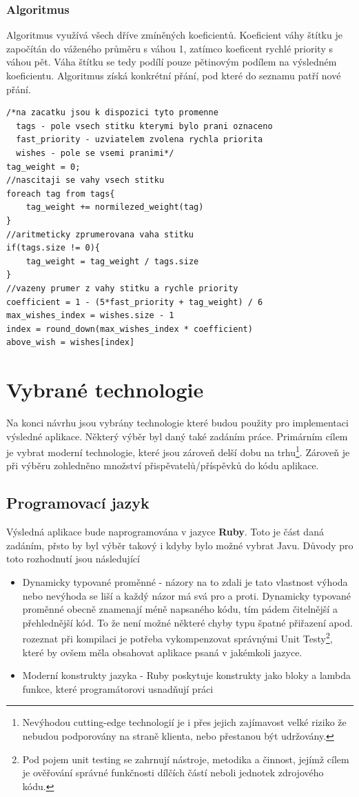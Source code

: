 \subsubsection{Algoritmus}
Algoritmus využívá všech dříve zmíněných koeficientů. Koeficient váhy štítku je započítán do váženého průměru s váhou 1, zatímco koeficent rychlé priority s váhou pět. Váha štítku se tedy podílí pouze pětinovým podílem na výsledném koeficientu. Algoritmus získá konkrétní přání, pod které do seznamu patří nové přání.
\lstset{language = c, style=custom}
\begin{lstlisting}
/*na zacatku jsou k dispozici tyto promenne
  tags - pole vsech stitku kterymi bylo prani oznaceno
  fast_priority - uzviatelem zvolena rychla priorita
  wishes - pole se vsemi pranimi*/
tag_weight = 0;
//nascitaji se vahy vsech stitku
foreach tag from tags{
	tag_weight += normilezed_weight(tag)
}
//aritmeticky zprumerovana vaha stitku
if(tags.size != 0){
	tag_weight = tag_weight / tags.size
}
//vazeny prumer z vahy stitku a rychle priority
coefficient = 1 - (5*fast_priority + tag_weight) / 6
max_wishes_index = wishes.size - 1
index = round_down(max_wishes_index * coefficient)
above_wish = wishes[index]
\end{lstlisting}

\section{Vybrané technologie}
Na konci návrhu jsou vybrány technologie které budou použity pro implementaci výsledné aplikace. Některý výběr byl daný také zadáním práce. Primárním cílem je vybrat moderní technologie, které jsou zároveň delší dobu na trhu\footnote{Nevýhodou cutting-edge technologií je i přes jejich zajímavost velké riziko že nebudou podporovány na straně klienta, nebo přestanou být udržovány.}. Zároveň je při výběru zohledněno množství přispěvatelů/příspěvků do kódu aplikace.
\subsection{Programovací jazyk}
Výsledná aplikace bude naprogramována v jazyce \textbf{Ruby}. Toto je část daná zadáním, přsto by byl výběr takový i kdyby bylo možné vybrat Javu. Důvody pro toto rozhodnutí jsou následující
\begin{itemize}
\item Dynamicky typované proměnné - názory na to zdali je tato vlastnost výhoda nebo nevýhoda se liší a každý názor má svá pro a proti. Dynamicky typované proměnné obecně znamenají méně napsaného kódu, tím pádem čitelnější a přehlednější kód. To že není možné některé chyby typu špatné přiřazení apod. rozeznat při kompilaci je potřeba vykompenzovat správnými Unit Testy\footnote{Pod pojem unit testing se zahrnují nástroje, metodika a činnost, jejímž cílem je ověřování správné funkčnosti dílčích částí neboli jednotek zdrojového kódu.}, které by ovšem měla obsahovat aplikace psaná v jakémkoli jazyce\cite{website:oreilly:unit-testing}.
\item Moderní konstrukty jazyka - Ruby poskytuje konstrukty jako bloky a lambda funkce, které programátorovi usnadňují práci

\end{itemize}

